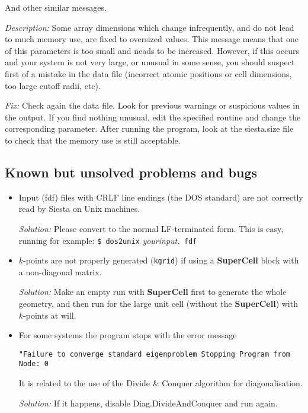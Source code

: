 \documentclass[11pt]{article}
\begin{document}
\begin{description}
\itemsep 10pt
\parsep 0pt

\item[{\tt chkdim: ERROR: In {\it routine} dimension {\it parameter} =
{\it value}. It must be  ...}]

And other similar messages.

{\it Description:}
Some array dimensions which change infrequently, and do not lead to
much memory use, are fixed to oversized values. This message means that
one of this parameters is too small and neads to be increased.
However, if this occurs and your system is not very large, or unusual in
some sense, you should suspect first of a mistake in the data file (incorrect
atomic positions or cell dimensions, too large cutoff radii, etc).

{\it Fix:}
Check again the data file. 
Look for previous warnings or suspicious values in the output.
If you find nothing unusual, edit the specified routine and change the 
corresponding parameter.
After running the program, look at the siesta.size file to check that
the memory use is still acceptable.

\end{description}



\subsection{Known but unsolved problems and bugs}

\begin{itemize}

\item
Input (fdf) files with CRLF line endings (the DOS standard) are not
correctly read by {\sc Siesta} on Unix machines. 

{\it Solution:} Please convert to the normal LF-terminated form. This
is easy, running for example: {\tt \$ dos2unix} {\it yourinput.}{\tt
fdf}

\item
$k$-points are not properly generated ({\tt kgrid}) if using a
{\bf SuperCell} block with a non-diagonal matrix. 

{\it Solution:} Make an empty run with {\bf SuperCell} first to generate 
the whole geometry, and then run for the large unit cell (without the 
{\bf SuperCell}) with $k$-points at will.

\item 
For some systems the program stops with the error message

{\tt "Failure to converge standard eigenproblem
Stopping Program from Node:    0}

It is related to the use of the Divide \& Conquer algorithm for
diagonalisation.

{\it Solution:} If it happens, disable Diag.DivideAndConquer and run again. 

\end{itemize}
\end{document}
